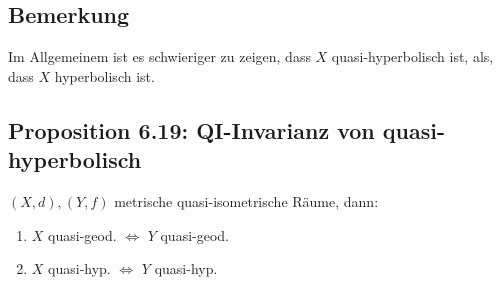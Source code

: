 \documentclass{article}
\begin{document}
\subsection{Bemerkung}
Im Allgemeinem ist es schwieriger zu zeigen, dass $X$ quasi-hyperbolisch ist, als, dass $X$ hyperbolisch ist.

\subsection{Proposition 6.19: QI-Invarianz von quasi-hyperbolisch}
$(X,d), (Y, f)$ metrische quasi-isometrische Räume, dann:
\begin{enumerate}
	\item $X$ quasi-geod. $\Longleftrightarrow$ $Y$ quasi-geod.
	\item $X$ quasi-hyp. $\Longleftrightarrow$ $Y$ quasi-hyp.
\end{enumerate}
\end{document}
